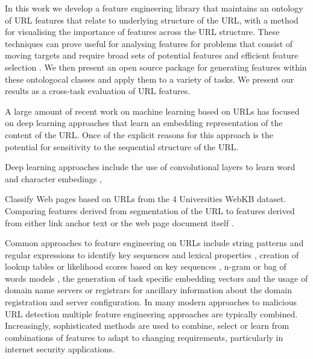 \documentclass[sigconf]{acmart}
\begin{document}
In this work we develop a feature engineering library that maintains an ontology of URL features 
that relate to underlying structure of the URL, with a method for visualising the importance of features
across the URL structure. These techniques can prove useful for analysing features for problems that
consist of moving targets and require broad sets of potential features and efficient feature selection \cite{Basnet2012}. 
We then present an open source package for generating features within these
ontologocal classes and apply them to a variety of tasks. We present our results as a
cross-task evaluation of URL features.  
 
A large amount of recent work on machine learning based on URLs has focused on deep learning approaches that
learn an embedding representation of the content of the URL. Once of the explicit reasons 
for this approach is the potential for sensitivity to the sequential structure of the URL.
\cite{Le2018}

Deep learning approaches include the use of convolutional layers to learn word and character 
embedings \cite{Le2018},


Classify Web pages based on URLs from the 4 Universities WebKB dataset. Comparing features derived from segmentation
of the URL to features derived from either link anchor text or the web page document itself \cite{Kan2004}.

Common approaches to feature engineering on URLs include string patterns and regular expressions to
identify key sequences and lexical properties \cite{Kan2004,Garera2007,Mamun2016,Tupsamudre2019}, 
creation of lookup tables or likelihood scores based on key sequences
\cite{Meshkizadeh2010}, n-gram or bag of words models \cite{Baykan2009,Verma2017}, 
the generation of task specific embedding vectors\cite{Le2018,Qiu2020} and the
usage of domain name servers or registrars for ancillary information about the domain registration 
and server configuration\cite{Canali2011,Li2020}. In many modern approaches to malicious URL detection
multiple feature engineering approaches are typically combined\cite{Sayamber2014,Li2020}. Increasingly,
sophisticated methods are used to combine, select or learn from combinations of features to adapt to
changing requirements, particularly in internet security applications\cite{Sountharrajan2020,Li2020}.
\end{document}
